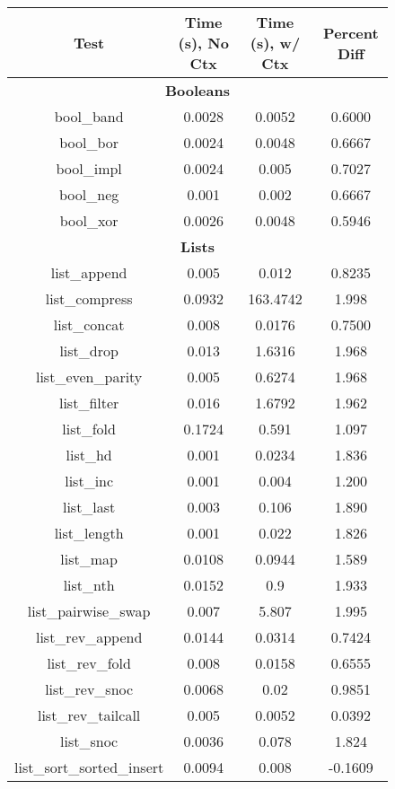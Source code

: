 \begin{figure}
  \begin{center}
  \tabcolsep 5.8pt
  \footnotesize
  \begin{tabular}{cccc}
  \hline
  \textbf{Test} & \textbf{Time (s), No Ctx} & \textbf{Time (s), w/ Ctx} & \textbf{Percent Diff} \\
  \hline

\multicolumn{4}{c}{\textbf{Booleans}} \\
bool\_band & 0.0028 & 0.0052 & 0.6000 \\
bool\_bor & 0.0024 & 0.0048 & 0.6667 \\
bool\_impl & 0.0024 & 0.005 & 0.7027 \\
bool\_neg & 0.001 & 0.002 & 0.6667 \\
bool\_xor & 0.0026 & 0.0048 & 0.5946 \\
\multicolumn{4}{c}{\textbf{Lists}} \\
list\_append & 0.005 & 0.012 & 0.8235 \\
list\_compress & 0.0932 & 163.4742 & 1.998 \\
list\_concat & 0.008 & 0.0176 & 0.7500 \\
list\_drop & 0.013 & 1.6316 & 1.968 \\
list\_even\_parity & 0.005 & 0.6274 & 1.968 \\
list\_filter & 0.016 & 1.6792 & 1.962 \\
list\_fold & 0.1724 & 0.591 & 1.097 \\
list\_hd & 0.001 & 0.0234 & 1.836 \\
list\_inc & 0.001 & 0.004 & 1.200 \\
list\_last & 0.003 & 0.106 & 1.890 \\
list\_length & 0.001 & 0.022 & 1.826 \\
list\_map & 0.0108 & 0.0944 & 1.589 \\
list\_nth & 0.0152 & 0.9 & 1.933 \\
list\_pairwise\_swap & 0.007 & 5.807 & 1.995 \\
list\_rev\_append & 0.0144 & 0.0314 & 0.7424 \\
list\_rev\_fold & 0.008 & 0.0158 & 0.6555 \\
list\_rev\_snoc & 0.0068 & 0.02 & 0.9851 \\
list\_rev\_tailcall & 0.005 & 0.0052 & 0.0392 \\
list\_snoc & 0.0036 & 0.078 & 1.824 \\
list\_sort\_sorted\_insert & 0.0094 & 0.008 & -0.1609 \\

\end{tabular}
\end{center}
\end{figure}
